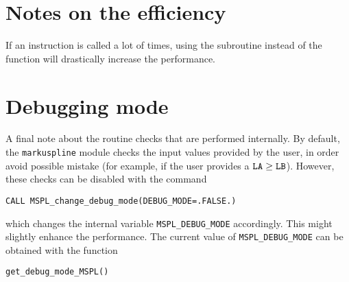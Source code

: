 \documentclass[11pt,a4paper,twoside]{article}
\begin{document}
\section{Notes on the efficiency}
If an instruction is called a lot of times, using the subroutine instead of the function will drastically increase the performance.

\section{Debugging mode}
A final note about the routine checks that are performed internally.
By default, the \verb+markuspline+ module checks the input values provided by the user, in order avoid possible mistake (for example, if the user provides a $\verb!LA! \geq \verb!LB!$).
However, these checks can be disabled with the command
\begin{verbatim}
CALL MSPL_change_debug_mode(DEBUG_MODE=.FALSE.)
\end{verbatim}
which changes the internal variable \verb+MSPL_DEBUG_MODE+ accordingly.
This might slightly enhance the performance.
The current value of \verb+MSPL_DEBUG_MODE+ can be obtained with the function
\begin{verbatim}
get_debug_mode_MSPL()
\end{verbatim}








\printindex
\end{document}
